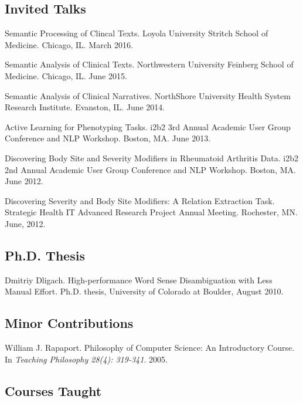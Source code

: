 \documentclass[letterpaper]{article}
\renewenvironment{itemize}{
  \begin{list}{}{
    \setlength{\leftmargin}{1.5em}
  }
}{
  \end{list}
}
\begin{document}
\subsection*{Invited Talks}
\begin{itemize}
\item Semantic Processing of Clincal Texts. Loyola University Stritch School of Medicine. Chicago, IL. March 2016.
\item Semantic Analysis of Clinical Texts. Northwestern University Feinberg School of Medicine. Chicago, IL. June 2015.
\item Semantic Analysis of Clinical Narratives. NorthShore University Health System Research Institute. Evanston, IL. June 2014.
\item Active Learning for Phenotyping Tasks. i2b2 3rd Annual Academic User Group Conference and NLP Workshop. Boston, MA. June 2013.
\item Discovering Body Site and Severity Modifiers in Rheumatoid Arthritis Data. i2b2 2nd Annual Academic User Group Conference and NLP Workshop. Boston, MA. June 2012.
\item Discovering Severity and Body Site Modifiers: A Relation Extraction Task. Strategic Health IT Advanced Research Project Annual Meeting. Rochester, MN. June, 2012.
\end{itemize}

\subsection*{Ph.D. Thesis}
\begin{itemize}
\item Dmitriy Dligach. High-performance Word Sense Disambiguation with Less Manual Effort. Ph.D. thesis, University of Colorado at Boulder, August 2010.
\end{itemize}

\subsection*{Minor Contributions}
\begin{itemize}
\item William J. Rapaport. Philosophy of Computer Science: An Introductory Course. In \emph {Teaching Philosophy 28(4): 319-341}. 2005.
\end{itemize}

\subsection*{Courses Taught}
\end{document}
